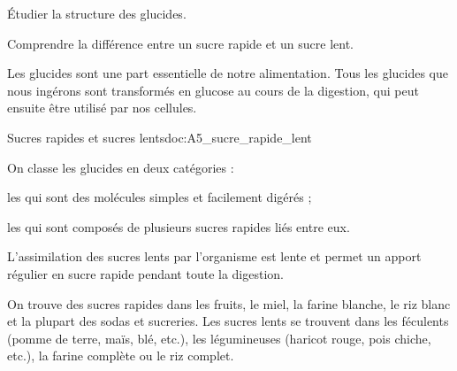 \tetePremStssStru


\begin{objectifs}
  \item Étudier la structure des glucides.
  \item Comprendre la différence entre un sucre rapide et un sucre lent.
\end{objectifs}

\begin{contexte}
  Les glucides sont une part essentielle de notre alimentation.
  Tous les glucides que nous ingérons sont transformés en glucose au cours de la digestion,
  qui peut ensuite être utilisé par nos cellules.

\end{contexte}



\begin{doc}{Sucres rapides et sucres lents}{doc:A5_sucre_rapide_lent}
  \begin{importants}
    On classe les glucides en deux catégories :
    \begin{listePoints}
      \item les  qui sont des molécules simples et facilement digérés ;
      \item les  qui sont composés de plusieurs sucres rapides liés entre eux.  
    \end{listePoints}
    L'assimilation des sucres lents par l'organisme est lente et permet un apport régulier en sucre rapide pendant toute la digestion.
  \end{importants}

  On trouve des sucres rapides dans les fruits, le miel, la farine blanche, le riz blanc et la plupart des sodas et sucreries.
  Les sucres lents se trouvent dans les féculents (pomme de terre, maïs, blé, etc.), les légumineuses (haricot rouge, pois chiche, etc.), la farine complète ou le riz complet.
\end{doc}

